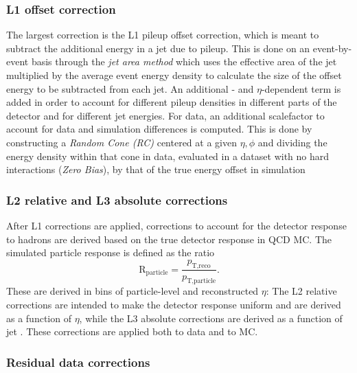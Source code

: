 \subsubsection{L1 offset correction}
The largest correction is the L1 pileup offset correction, which is meant to subtract the additional energy in a jet due to pileup. This is done on an event-by-event basis through the \textit{jet area method} which uses the effective area of the jet multiplied by the average event energy density to calculate the size of the offset energy to be subtracted from each jet. An additional \PT- and $\eta$-dependent term is added in order to account for different pileup densities in different parts of the detector and for different jet energies. For data, an additional scalefactor to account for data and simulation differences is computed. This is done by constructing a \textit{Random Cone (RC)} centered at a given $\eta,\phi$ and dividing the energy density within that cone in data, evaluated in a dataset with no hard interactions (\textit{Zero Bias}), by that of the true energy offset in simulation

\subsubsection{L2 relative and L3 absolute corrections}
After L1 corrections are applied, corrections to account for the detector response to hadrons are derived based on the true detector response in QCD MC. The simulated particle response is defined as the ratio
\begin{equation}
  \textrm{R}_{\textrm{particle}}=\frac{p_{\textrm{T,reco}}}{p_{\textrm{T,particle}}}.
  \end{equation}
 These are derived in bins of particle-level \PT and reconstructed $\eta$: The L2 relative corrections are intended to make the detector response uniform and are derived as a function of $\eta$, while the L3 absolute corrections are derived as a function of jet \PT. These corrections are applied both to data and to MC.
 
\subsubsection{Residual data corrections}


